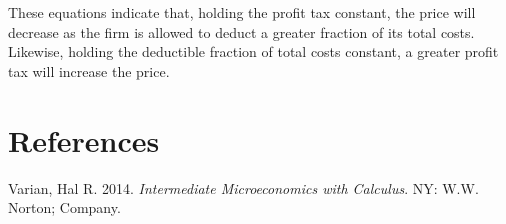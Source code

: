 \documentclass[
]{article}
\newlength{\cslhangindent}
\newenvironment{CSLReferences}[2] %
 {\begin{list}{}{%
  \setlength{\itemindent}{0pt}
  \setlength{\leftmargin}{0pt}
  \setlength{\parsep}{0pt}
  \ifodd #1
   \setlength{\leftmargin}{\cslhangindent}
   \setlength{\itemindent}{-1\cslhangindent}
  \fi
  \setlength{\itemsep}{#2\baselineskip}}}
 {\end{list}}
\begin{document}
These equations indicate that, holding the profit tax constant, the
price will decrease as the firm is allowed to deduct a greater fraction
of its total costs. Likewise, holding the deductible fraction of total
costs constant, a greater profit tax will increase the price.

\section*{References}\label{references}

\label{refs}
\begin{CSLReferences}{1}{0}
Varian, Hal R. 2014. \emph{Intermediate Microeconomics with Calculus}.
NY: W.W. Norton; Company.

\end{CSLReferences}
\end{document}

